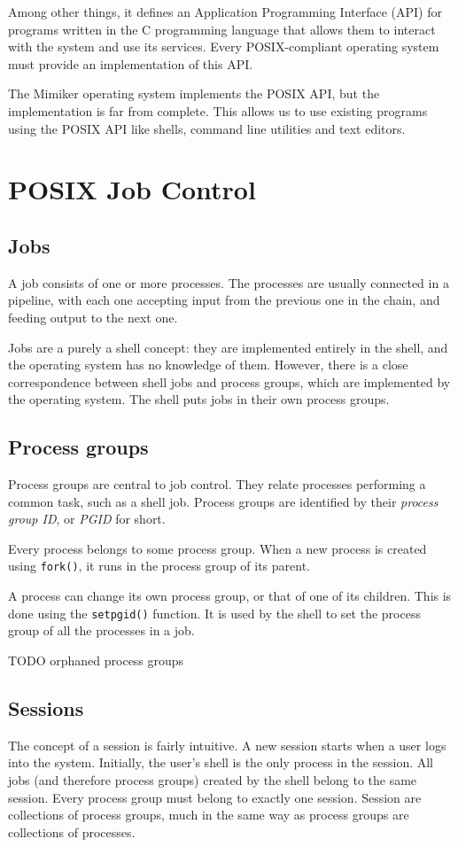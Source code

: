 \documentclass[shortabstract, manyadvisors, english, mgr]{iithesis}
\begin{document}
Among other things, it defines an Application Programming Interface (API) for
programs written in the C programming language that allows them to interact with
the system and use its services. Every POSIX-compliant operating system must
provide an implementation of this API.

The Mimiker operating system implements the POSIX API, but the implementation is
far from complete. This allows us to use existing programs using the POSIX API
like shells, command line utilities and text editors.

\section{POSIX Job Control}

\subsection{Jobs}
A job consists of one or more processes. The processes are usually connected in
a pipeline, with each one accepting input from the previous one in the chain,
and feeding output to the next one.

Jobs are a purely a shell concept: they are implemented entirely in the shell,
and the operating system has no knowledge of them. However, there is a close
correspondence between shell jobs and process groups, which are implemented by
the operating system. The shell puts jobs in their own process groups.
\subsection{Process groups}
Process groups are central to job control. They relate processes performing a
common task, such as a shell job. Process groups are identified by their
\textit{process group ID}, or \textit{PGID} for short.

Every process belongs to some process group. When a new process is created using
\texttt{fork()}\cite{fork}, it runs in the process group of its parent.

A process can change its own process group, or that of one of its children. This
is done using the \texttt{setpgid()}\cite{setpgid} function. It is used by the shell to set
the process group of all the processes in a job.

TODO orphaned process groups
\subsection{Sessions}
The concept of a session is fairly intuitive.
A new session starts when a user logs into the system. Initially, the user's
shell is the only process in the session. All jobs (and therefore process
groups) created by the shell belong to the same session. Every process group
must belong to exactly one session. Session are collections of process groups,
much in the same way as process groups are collections of processes.
\end{document}
